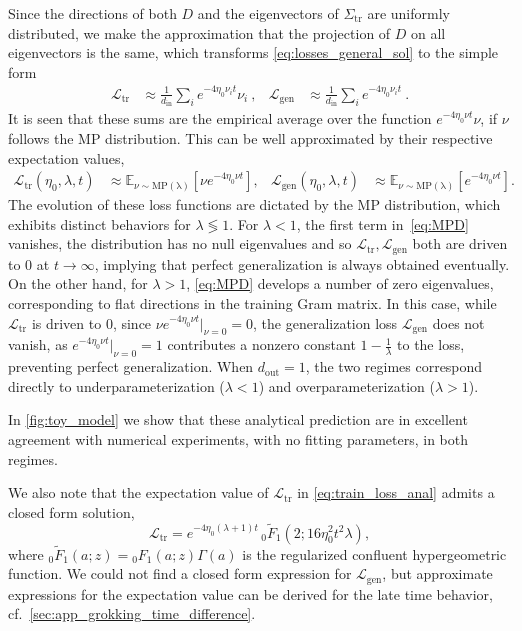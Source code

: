\documentclass[a4paper,11pt]{article}
\newcommand{\dout}{d_\mathrm{out}}
\newcommand{\din}{d_\mathrm{in}}
\newcommand{\training}{\mathrm{tr}}
\newcommand{\gen}{\mathrm{gen}}
\newcommand{\mcL}{\mathcal{L}}
\begin{document}
Since the directions of both $D$ and the  eigenvectors of $\Sigma_\training$ are uniformly distributed, we make the approximation that the projection of $D$ on all eigenvectors is the same, which transforms \cref{eq:losses_general_sol} to the simple form
\begin{align}
\label{eq:MP_loss_sums}
   \mathcal{L}_\training &\approx \frac{1}{\din}\sum_i e^{-4\eta_0 \nu_i  t}  \nu_i\ ,
    &
    \mathcal{L}_\gen &\approx \frac{1}{\din} \sum_i e^{-4 \eta_0\nu_i  t} \ .
\end{align}
It is seen that these sums are the empirical average over the function $e^{-4 \eta_0 \nu t} \nu$, if $\nu$ follows the MP distribution. This can be well approximated by their respective expectation values,
\begin{align}
\label{eq:train_loss_anal}
  \mathcal{L}_\training(\eta_0, \lambda, t) &\approx
  \mathbb{E}_{\nu\sim \mathrm{MP(\lambda)}}\left[ \nu e^{-4\eta_0  \nu t}\right]
  , &
  \mathcal{L}_\gen(\eta_0, \lambda, t) &\approx
  \mathbb{E}_{\nu\sim \mathrm{MP(\lambda)}}\left[ e^{-4\eta_0  \nu t}\right]
  .
\end{align}
The evolution of these loss functions are dictated by the MP distribution, which exhibits distinct behaviors for $\lambda \lessgtr 1$. For $\lambda<1$, the first term in~\cref{eq:MPD} vanishes, the distribution has no null eigenvalues and so $\mcL_\training, \mcL_\gen$ both are driven to $0$ at $t \to \infty$, implying that perfect generalization is always obtained eventually. On the other hand, for $\lambda>1$, \cref{eq:MPD} develops a number of zero eigenvalues, corresponding to flat directions in the training Gram matrix. In this case, while $\mcL_\training$ is driven to 0, since $\nu e^{-4\eta_0 \nu t}|_{\nu=0}=0$, the generalization loss $\mcL_\gen$ does not vanish, as $ e^{-4\eta_0 \nu t}|_{\nu=0}=1$ contributes a nonzero constant $1-\frac{1}{\lambda}$ to the loss, preventing perfect generalization. When $\dout=1$, the two regimes correspond directly to underparameterization ($\lambda<1$) and overparameterization ($\lambda>1$).

In \cref{fig:toy_model} we show that these analytical prediction are in excellent agreement with numerical experiments, with no fitting parameters, in both regimes. 

We also note that the expectation value of $\mathcal{L}_\training$ in \cref{eq:train_loss_anal} admits a closed form solution, 
\begin{equation}
    \mathcal{L}_\training=e^{-4 \eta_0 (\lambda +1) t} \, _0\tilde{F}_1\left(2;16 \eta_0^2 t^2 \lambda \right) ,
\end{equation}
where $_0\tilde{F}_1 \left(a;z\right)= {_0{F}_1} (a;z)\Gamma (a)$ is the regularized confluent hypergeometric function. We could not find a closed form expression for $\mathcal{L}_\gen$, but approximate expressions for the expectation value can be derived for the late time behavior, cf.~\cref{sec:app_grokking_time_difference}.
\end{document}
